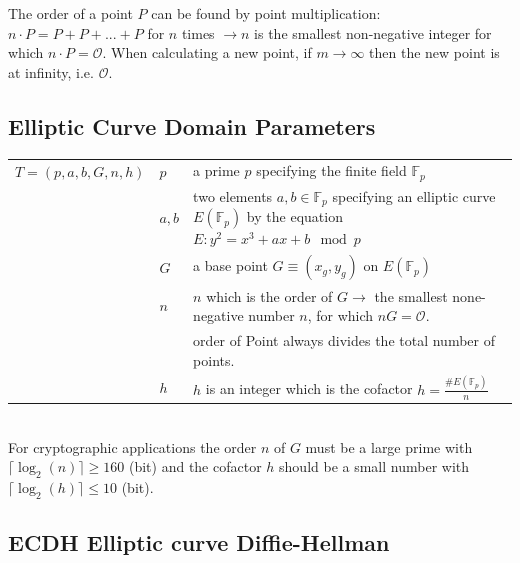The order of a point $P$ can be found by point multiplication: $n \cdot P=P+P+...+P$ for $n$ times $\to n$ is the smallest non-negative integer for which $n \cdot P=\mathcal{O}$. 
When calculating a new point, if $m\to \infty$ then the new point is at infinity, i.e. $\mathcal{O}$.

\subsection{Elliptic Curve Domain Parameters}
\begin{tabular}{l l p{11cm}}
	$T=(p,a,b,G,n,h)$	&	$p$		&	a prime $p$ specifying the finite field $\mathbb{F}_p$ \\
						&	$a,b$	&	two elements $a,b \in \mathbb{F}_p$ specifying an elliptic curve $E(\mathbb{F}_p)$ by the equation
										$E: y^2=x^3+ax+b \mod p$ \\
						&	$G$		&	a base point $G \equiv (x_g, y_g)$ on $E(\mathbb{F}_p)$\\
						&	$n$		&	$n$ which is the order of $G \to$ the smallest none-negative number $n$, for which $nG=\mathcal{O}$.\\
						&			&	order of Point always divides the total number of points.\\
						&	$h$		& 	$h$ is an integer which is the cofactor $h=\frac{ \#E(\mathbb{F}_p) }{n}$ \\
\end{tabular}\\

For cryptographic applications the order $n$ of $G$ must be a large prime with $\lceil \log_2(n) \rceil \geq 160$ (bit) and the cofactor $h$
should be a small number with $\lceil \log_2(h) \rceil \leq 10$ (bit).

\subsection{ECDH Elliptic curve Diffie-Hellman}

